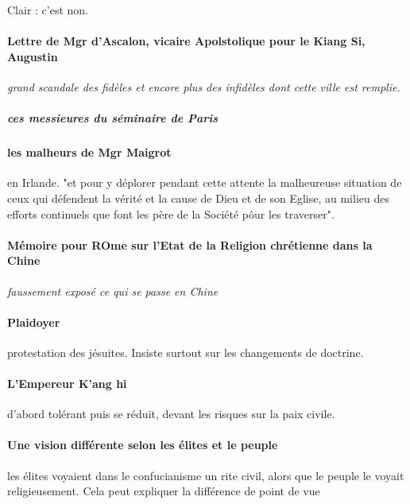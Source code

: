 Clair : c'est non.

\paragraph{Lettre de Mgr d'Ascalon, vicaire Apolstolique pour le Kiang Si, Augustin}

\textit{grand scandale des fidèles et encore plus des infidèles dont cette ville est remplie. }

\subparagraph{ces messieures du séminaire de Paris}

\paragraph{les malheurs de Mgr Maigrot} en Irlande. "et pour y déplorer pendant cette attente la malheureuse situation de ceux qui défendent la vérité et la cause de Dieu et de son Eglise, au milieu des efforts continuels que font les père de la Société pôur les traverser". 


\paragraph{Mémoire pour ROme sur l'Etat de la Religion chrétienne dans la Chine} \textit{faussement exposé ce qui se passe en Chine}
\paragraph{Plaidoyer} protestation des jésuites. Insiste surtout sur les changements de doctrine.  

\paragraph{L'Empereur K'ang hi} d'abord tolérant puis se réduit, devant les risques sur la paix civile.



\paragraph{Une vision différente selon les élites et le peuple} les élites voyaient dans le confucianisme un rite civil, alors que le peuple le voyait religieusement. Cela peut expliquer la différence de point de vue

